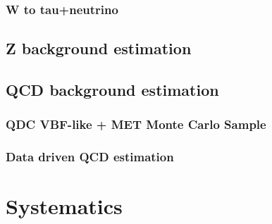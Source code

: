 \subsubsection{W to tau+neutrino}

\subsection{Z background estimation}

\subsection{QCD background estimation}

\subsubsection{QDC VBF-like + MET Monte Carlo Sample}

\subsubsection{Data driven QCD estimation}

\section{Systematics}

